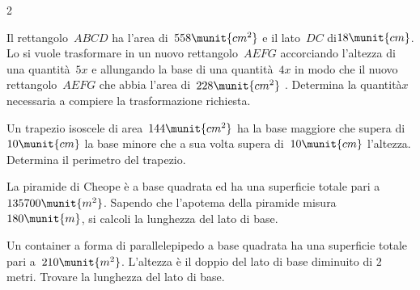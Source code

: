 \begin{htmulticols}{2}
\begin{esercizio}[*]
\label{ese:3.145}
Il rettangolo~\(ABCD\) ha l'area di~\(558\munit{cm^2}\) e il lato~\(DC\) 
di\(18\munit{cm}\). 
Lo si vuole trasformare in un nuovo rettangolo~\(AEFG\) accorciando 
l'altezza di una quantità~\(5x\) e allungando la base di una 
quantità~\(4x\) in modo che il nuovo rettangolo~\(AEFG\) che abbia 
l'area di~\(228\munit{cm^2}~\).
Determina la quantità\( x\) necessaria a compiere la trasformazione 
richiesta.
\end{esercizio}
% 

\begin{esercizio}
\label{ese:3.147}
Un trapezio isoscele di area~\(144\munit{cm^2}\) ha la base maggiore che 
supera di~\(10\munit{cm}\) la base minore che a sua volta supera 
di~\(10\munit{cm}\) l'altezza. 
Determina il perimetro del trapezio.
\end{esercizio}
% 

\begin{esercizio}
\label{ese:3.149}
La piramide di Cheope è a base quadrata ed ha una superficie totale pari a
\( 135700\munit{m^2}\).
Sapendo che l'apotema della piramide misura~\(180\munit{m}\), 
si calcoli la lunghezza del lato di base.
\end{esercizio}

\begin{esercizio}
\label{ese:3.150}
Un container a forma di parallelepipedo a base quadrata ha una superficie
totale pari a~\(210\munit{m^2}\). L'altezza è il doppio del lato di base 
diminuito di \(2\) metri. Trovare la lunghezza del lato di base.
\end{esercizio}


\end{htmulticols}

